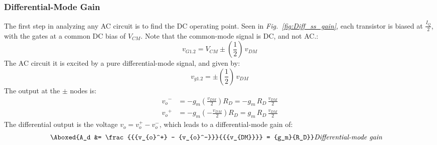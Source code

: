 \subsubsection{Differential-Mode Gain}
The first step in analyzing any AC circuit is to find the DC operating point.  Seen in \emph{Fig.~\ref{fig:Diff_ss_gain}}, each transistor is biased at $\frac{I_Q}{2}$, with the gates at a common DC bias of $V_{CM}$.  Note that the common-mode signal is DC, and not AC.:
    \begin{equation}
        v_{G1.2} = V_{CM} \pm \left(\frac{1}{2}\right)\,v_{DM}
    \end{equation}
The AC circuit it is excited by a pure differential-mode signal, and given by:
    \begin{equation}
        v_{g1.2} = \pm \left(\frac{1}{2}\right)\,v_{DM}
    \end{equation}
The output at the $\pm$ nodes is:
    \begin{align}
        {v_o}^- &= -g_m\left(\frac{{v_{DM}}}{2}\right){R_D} = -g_m\,R_D\,\frac{{v_{DM}}}{2}\\[0.2cm]
        {v_o}^+ &= -g_m\left(-\frac{{v_{DM}}}{2}\right){R_D} = g_m\,R_D\,\frac{{v_{DM}}}{2}
    \end{align}
The differential output is the voltage $v_o = v_o^+ - v_o^-$, which leads to a differential-mode gain of:
    \begin{align} 
        \Aboxed{A_d &= \frac{{{v_{o}^+} - {v_{o}^-}}}{{{v_{DM}}}} = {g_m}{R_D}}
        &\textit{Differential-mode gain}
        \label{eq:diff_mode_gain}
    \end{align}
